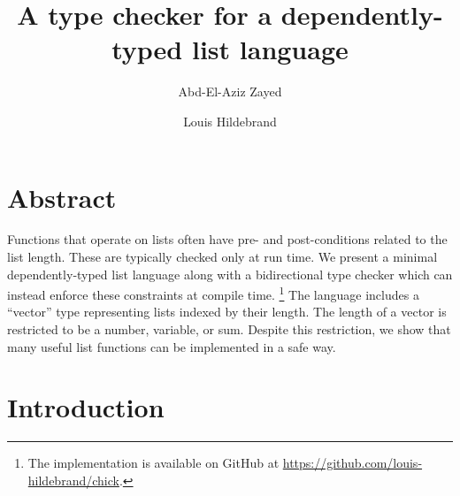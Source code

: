 \documentclass[acmsmall,nonacm]{acmart}
\title{A type checker for a dependently-typed list language}
\author{Abd-El-Aziz Zayed}
\affiliation{%
  \institution{McGill University}
  \city{Montreal}
  \country{Canada}
}
\author{Louis Hildebrand}
\affiliation{%
  \institution{McGill University}
  \city{Montreal}
  \country{Canada}
}
\newcommand{\githuburl}{\url{https://github.com/louis-hildebrand/chick}}
\begin{document}
\maketitle

\section{Abstract}

Functions that operate on lists often have pre- and post-conditions related to the list length.
These are typically checked only at run time.
We present a minimal dependently‑typed list language along with a bidirectional type checker which can instead enforce these constraints at compile time.
\footnote{The implementation is available on GitHub at \githuburl.}
The language includes a ``vector'' type representing lists indexed by their length.
The length of a vector is restricted to be a number, variable, or sum.
Despite this restriction, we show that many useful list functions can be implemented in a safe way.

\section{Introduction}
\end{document}
